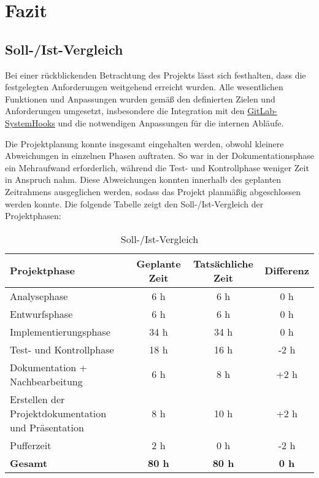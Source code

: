 \section{Fazit} 
\label{sec:Fazit}

\subsection{Soll-/Ist-Vergleich}
\label{sec:SollIstVergleich}

Bei einer rückblickenden Betrachtung des Projekts lässt sich festhalten, dass die festgelegten Anforderungen weitgehend erreicht wurden. Alle wesentlichen Funktionen und Anpassungen wurden gemäß den definierten Zielen und Anforderungen umgesetzt, insbesondere die Integration mit den \hyperlink{GitLabSystemhooks}{\textcolor{AOBlau}{GitLab-SystemHooks}} und die notwendigen Anpassungen für die internen Abläufe.

Die Projektplanung konnte insgesamt eingehalten werden, obwohl kleinere Abweichungen in einzelnen Phasen auftraten. So war in der Dokumentationsphase ein Mehraufwand erforderlich, während die Test- und Kontrollphase weniger Zeit in Anspruch nahm. Diese Abweichungen konnten innerhalb des geplanten Zeitrahmens ausgeglichen werden, sodass das Projekt planmäßig abgeschlossen werden konnte. Die folgende Tabelle zeigt den Soll-/Ist-Vergleich der Projektphasen:

\begin{table}[h]
\centering
\caption{Soll-/Ist-Vergleich}
\label{tab:Vergleich}
\begin{tabular}{|l|c|c|c|}
\hline
\textbf{Projektphase} & \textbf{Geplante Zeit} & \textbf{Tatsächliche Zeit} & \textbf{Differenz} \\
\hline
Analysephase & 6 h & 6 h & 0 h \\
\hline
Entwurfsphase & 6 h & 6 h & 0 h \\
\hline
Implementierungsphase & 34 h & 34 h & 0 h \\
\hline
Test- und Kontrollphase & 18 h & 16 h & -2 h \\
\hline
Dokumentation + Nachbearbeitung & 6 h & 8 h & +2 h \\
\hline
Erstellen der Projektdokumentation und Präsentation & 8 h & 10 h & +2 h \\
\hline
Pufferzeit & 2 h & 0 h & -2 h \\
\hline
\textbf{Gesamt} & \textbf{80 h} & \textbf{80 h} & \textbf{0 h} \\
\hline
\end{tabular}
\end{table}

